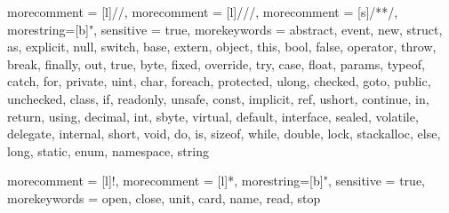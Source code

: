 %
{
 morecomment = [l]{//}, 
 morecomment = [l]{///},
 morecomment = [s]{/*}{*/},
 morestring=[b]", 
 sensitive = true,
 morekeywords = {abstract,  event,  new,  struct,
   as,  explicit,  null,  switch,
   base,  extern,  object,  this,
   bool,  false,  operator,  throw,
   break,  finally,  out,  true,
   byte,  fixed,  override,  try,
   case,  float,  params,  typeof,
   catch,  for,  private,  uint,
   char,  foreach,  protected,  ulong,
   checked,  goto,  public,  unchecked,
   class,  if,  readonly,  unsafe,
   const,  implicit,  ref,  ushort,
   continue,  in,  return,  using,
   decimal,  int,  sbyte,  virtual,
   default,  interface,  sealed,  volatile,
   delegate,  internal,  short,  void,
   do,  is,  sizeof,  while,
   double,  lock,  stackalloc,   
   else,  long,  static,   
   enum,  namespace,  string}
}

{
 morecomment = [l]{!}, 
 morecomment = [l]{*},
 morestring=[b]", 
 sensitive = true,
 morekeywords = {open, close, unit, card, name, read, stop }
}




